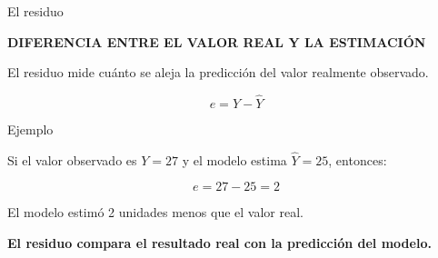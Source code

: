 \documentclass[aspectratio=169,11pt]{beamer}
\newcommand{\kicker}[1]{%
  {\scriptsize\bfseries\color{cAcc}\MakeUppercase{#1}}%
  \par\vspace{0.2em}%
}
\newcommand{\destaca}[1]{%
  {\color{cPrim}\bfseries #1}%
}
\newenvironment{cerrado}[1]
  {\begin{block}{#1}
   \begin{minipage}{\linewidth}
   \raggedright}
  {\end{minipage}
   \end{block}}
\begin{document}

\begin{frame}{El residuo}

  \begin{center}
    \begin{minipage}{0.86\textwidth}

      \kicker{DIFERENCIA ENTRE EL VALOR REAL Y LA ESTIMACIÓN}

      El residuo mide cuánto se aleja la predicción del valor
      realmente observado.

      \vspace{0.4em}

      \[
        e=Y-\hat{Y}
      \]

      \vspace{0.25em}

      \begin{cerrado}{Ejemplo}

        Si el valor observado es \(Y=27\) y el modelo estima
        \(\hat{Y}=25\), entonces:

        \[
          e=27-25=2
        \]

        El modelo estimó 2 unidades menos que el valor real.

      \end{cerrado}

      \vspace{0.45em}

      \begin{center}
        \destaca{El residuo compara el resultado real con la predicción
        del modelo.}
      \end{center}

    \end{minipage}
  \end{center}

\end{frame}
\end{document}
